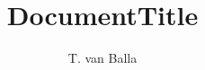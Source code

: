 \documentclass[11pt,english,twoside]{article}
\author{T. van Balla}
\begin{document}
\title{DocumentTitle}
\makekatdocbeginning
\end{document}
